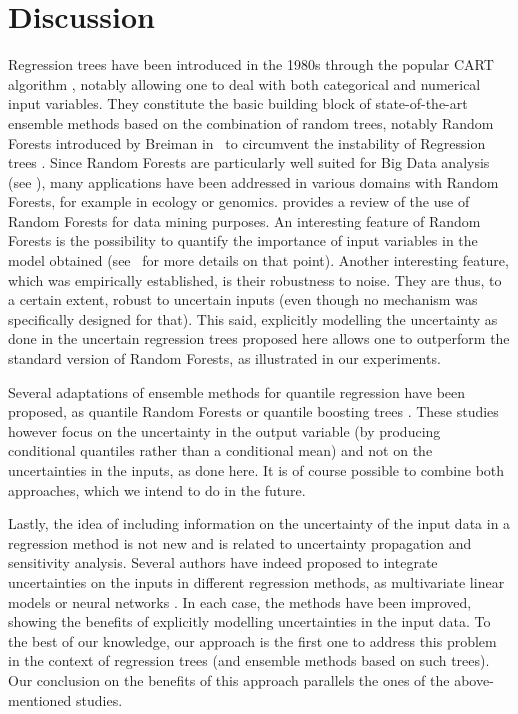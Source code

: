 \section{Discussion}
\label{sec:disc}

Regression trees have been introduced in the 1980s through the popular CART algorithm \cite{breiman1984classification}, notably allowing one to deal with both categorical and numerical input variables. They constitute the basic building block of state-of-the-art ensemble methods based on the combination of random trees, notably Random Forests introduced by Breiman in~\cite{breiman2001random} to circumvent the instability of Regression trees \cite{gey2006}. Since Random Forests are particularly well suited for Big Data analysis (see \cite{genuer2017}), many applications have been addressed in various domains with Random Forests, for example in ecology or genomics. \cite{verikas2011} provides a review of the use of Random Forests for data mining purposes. An interesting feature of Random Forests is the possibility to quantify the importance of input variables in the model obtained (see~\cite{genuer2010} for more details on that point). Another interesting feature, which was empirically established, is their robustness to noise. They are thus, to a certain extent, robust to uncertain inputs (even though no mechanism was specifically designed for that). This said, explicitly modelling the uncertainty as done in the uncertain regression trees proposed here allows one to outperform the standard version of  Random Forests, as illustrated in our experiments. 

Several adaptations of ensemble methods for quantile regression have been proposed, as quantile Random Forests or quantile boosting trees \cite{fenske2011identifying, kriegler2007boosting, kriegler2010small,meinshausen2006quantile,zheng2012}. These studies however focus on the uncertainty in the output variable (by producing conditional quantiles rather than a conditional mean) and not on the uncertainties in the inputs, as done here. It is of course possible to combine both approaches, which we intend to do in the future.

Lastly, the idea of including information on the uncertainty of the input data in a regression method is not new and is related to uncertainty propagation and sensitivity analysis. Several authors have indeed proposed to integrate uncertainties on the inputs in different regression methods, as multivariate linear models \cite{reis2005} or neural networks \cite{gal2016}. In each case, the methods have been improved, showing the benefits of explicitly modelling uncertainties in the input data. To the best of our knowledge, our approach is the first one to address this problem in the context of regression trees (and ensemble methods based on such trees). Our conclusion on the benefits of this approach parallels the ones of the above-mentioned studies.
